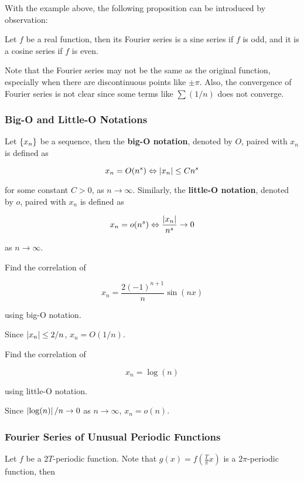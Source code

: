\documentclass[a4paper,12pt]{article}
\begin{document}
With the example above, the following proposition can be introduced by observation:\n

\begin{pst}
  Let $f$ be a real function, then its Fourier series is a sine series if $f$ is odd, and it is a cosine series if $f$ is even.
\end{pst}\n

Note that the Fourier series may not be the same as the original function, especially when there are discontinuous points like $\pm\pi$. Also, the convergence of Fourier series is not clear since some terms like $\sum(1/n)$ does not converge. 

\subsubsection{Big-O and Little-O Notations}
\begin{dft}
  Let $\left\{ x_{n}\right\}$ be a sequence, then the \textbf{big-O notation}, denoted by $O$, paired with $x_{n}$ is defined as

  $$x_{n}=O(n^{s})\Leftrightarrow\left| x_{n}\right|\leq Cn^{s}$$\s

  for some constant $C>0$, as $n\to\infty$. Similarly, the \textbf{little-O notation}, denoted by $o$, paired with $x_{n}$ is defined as

  $$x_{n}=o(n^{s})\Leftrightarrow\frac{\left| x_{n}\right|}{n^{s}}\to 0$$\s

  as $n\to\infty$.
\end{dft}\n

\begin{exm}
  Find the correlation of
  
  $$x_{n}=\frac{2(-1)^{n+1}}{n}\sin(nx)$$\s

  using big-O notation.\n

  \ans Since $\left| x_{n}\right|\leq 2/n$, $x_{n}=O(1/n)$.
\end{exm}\n

\begin{exm}
  Find the correlation of

  $$x_{n}=\log(n)$$\s

  using little-O notation.\n

  \ans Since $\left| \log(n)\right|/n\to 0$ as $n\to\infty$, $x_{n}=o(n)$.
\end{exm}

\subsubsection{Fourier Series of Unusual Periodic Functions}
Let $f$ be a $2T$-periodic function. Note that $g(x)=f(\frac{T}{\pi}x)$ is a $2\pi$-periodic function, then
\end{document}

